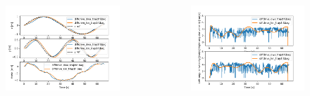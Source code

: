 \documentclass{beamer}
\begin{document}
\begin{frame}[allowframebreaks]
\begin{columns}
\vspace{-1em}

\begin{figure}[H]
    \centering
    \includegraphics[scale=0.3]{img/comparison/Pose.png}
\end{figure}


\vspace{-2em}

\begin{figure}[H]
    \centering
    \includegraphics[scale=0.3]{img/comparison/Wheels_Velocities.png}
\end{figure}

\vspace{-1em}


\end{columns}
\end{frame}
\end{document}
